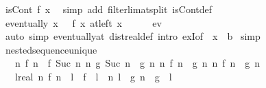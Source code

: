 \begin{isabellebody}
\ {\isacartoucheopen}isCont\ f\ x{\isacartoucheclose}\ \isamarkupfalse%
\ {\isacharparenleft}{\kern0pt}simp\ add{\isacharcolon}{\kern0pt}\ filterlim{\isacharunderscore}{\kern0pt}at{\isacharunderscore}{\kern0pt}split\ isCont{\isacharunderscore}{\kern0pt}def{\isacharparenright}{\kern0pt}\isanewline
\ \ \isamarkupfalse%
\ {\isachardoublequoteopen}eventually\ {\isacharparenleft}{\kern0pt}{\isasymlambda}x{\isachardot}{\kern0pt}\ {}\ {\isasymle}\ f\ x{\isacharparenright}{\kern0pt}\ {\isacharparenleft}{\kern0pt}at{\isacharunderscore}{\kern0pt}left\ x{\isacharparenright}{\kern0pt}{\isachardoublequoteclose}\isanewline
\ \ \ \ \isamarkupfalse%
\ ev\ \isamarkupfalse%
\ {\isacharparenleft}{\kern0pt}auto\ simp{\isacharcolon}{\kern0pt}\ eventually{\isacharunderscore}{\kern0pt}at\ dist{\isacharunderscore}{\kern0pt}real{\isacharunderscore}{\kern0pt}def\ intro{\isacharbang}{\kern0pt}{\isacharcolon}{\kern0pt}\ exI{\isacharbrackleft}{\kern0pt}of\ {\isacharunderscore}{\kern0pt}\ {\isachardoublequoteopen}x\ {\isacharminus}{\kern0pt}\ b{\isachardoublequoteclose}{\isacharbrackright}{\kern0pt}{\isacharparenright}{\kern0pt}\isanewline
{}\isamarkupfalse%
\ simp%
\endisatagproof
{\isafoldproof}%
%
\isadelimproof
%
\endisadelimproof
%
\isadelimdocument
%
\endisadelimdocument
%
\isatagdocument
%
\isamarkuptrue%
%
\endisatagdocument
{\isafolddocument}%
%
\isadelimdocument
%
\endisadelimdocument
{}\isamarkupfalse%
\ nested{\isacharunderscore}{\kern0pt}sequence{\isacharunderscore}{\kern0pt}unique{\isacharcolon}{\kern0pt}\isanewline
\ \ \ {\isachardoublequoteopen}{\isasymforall}n{\isachardot}{\kern0pt}\ f\ n\ {\isasymle}\ f\ {\isacharparenleft}{\kern0pt}Suc\ n{\isacharparenright}{\kern0pt}{\isachardoublequoteclose}\ {\isachardoublequoteopen}{\isasymforall}n{\isachardot}{\kern0pt}\ g\ {\isacharparenleft}{\kern0pt}Suc\ n{\isacharparenright}{\kern0pt}\ {\isasymle}\ g\ n{\isachardoublequoteclose}\ {\isachardoublequoteopen}{\isasymforall}n{\isachardot}{\kern0pt}\ f\ n\ {\isasymle}\ g\ n{\isachardoublequoteclose}\ {\isachardoublequoteopen}{\isacharparenleft}{\kern0pt}{\isasymlambda}n{\isachardot}{\kern0pt}\ f\ n\ {\isacharminus}{\kern0pt}\ g\ n{\isacharparenright}{\kern0pt}\ {\isasymlonglonglongrightarrow}\ {}{\isachardoublequoteclose}\isanewline
\ \ \ {\isachardoublequoteopen}{\isasymexists}l{\isacharcolon}{\kern0pt}{\isacharcolon}{\kern0pt}real{\isachardot}{\kern0pt}\ {\isacharparenleft}{\kern0pt}{\isacharparenleft}{\kern0pt}{\isasymforall}n{\isachardot}{\kern0pt}\ f\ n\ {\isasymle}\ l{\isacharparenright}{\kern0pt}\ {\isasymand}\ f\ {\isasymlonglonglongrightarrow}\ l{\isacharparenright}{\kern0pt}\ {\isasymand}\ {\isacharparenleft}{\kern0pt}{\isacharparenleft}{\kern0pt}{\isasymforall}n{\isachardot}{\kern0pt}\ l\ {\isasymle}\ g\ n{\isacharparenright}{\kern0pt}\ {\isasymand}\ g\ {\isasymlonglonglongrightarrow}\ l{\isacharparenright}{\kern0pt}{\isachardoublequoteclose}\isanewline

\end{isabellebody}
